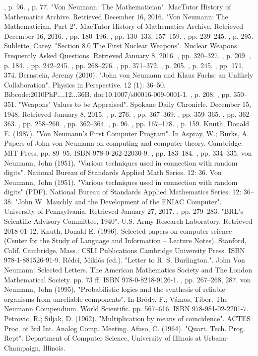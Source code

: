 \begin{enumerate}
, p. 96.
, p. 77.
"Von Neumann: The Mathematician". MacTutor History of Mathematics Archive. Retrieved December 16, 2016.
"Von Neumann: The Mathematician, Part 2". MacTutor History of Mathematics Archive. Retrieved December 16, 2016.
, pp. 180–196.
, pp. 130–133, 157–159.
, pp. 239–245.
, p. 295.
Sublette, Carey. "Section 8.0 The First Nuclear Weapons". Nuclear Weapons Frequently Asked Questions. Retrieved January 8, 2016.
, pp. 320–327.
, p. 209.
, p. 184.
, pp. 242–245.
, pp. 268–276.
, pp. 371–372.
, p. 205.
, p. 245.
, pp. 171, 374.
Bernstein, Jeremy (2010). "John von Neumann and Klaus Fuchs: an Unlikely Collaboration". Physics in Perspective. 12 (1): 36–50. Bibcode:2010PhP....12...36B. doi:10.1007/s00016-009-0001-1.
, p. 208.
, pp. 350–351.
"Weapons' Values to be Appraised". Spokane Daily Chronicle. December 15, 1948. Retrieved January 8, 2015.
, p. 276.
, pp. 367–369.
, pp. 359–365.
, pp. 362–363.
, pp. 258–260.
, pp. 362–364.
, p. 96.
, pp. 167–178.
, p. 159.
Knuth, Donald E. (1987). "Von Neumann's First Computer Program". In Aspray, W.; Burks, A. Papers of John von Neumann on computing and computer theory. Cambridge: MIT Press. pp. 89–95. ISBN 978-0-262-22030-9.
, pp. 183–184.
, pp. 334–335.
von Neumann, John (1951). "Various techniques used in connection with random digits". National Bureau of Standards Applied Math Series. 12: 36.
Von Neumann, John (1951). "Various techniques used in connection with random digits" (PDF). National Bureau of Standards Applied Mathematics Series. 12: 36–38.
"John W. Mauchly and the Development of the ENIAC Computer". University of Pennsylvania. Retrieved January 27, 2017.
, pp. 279–283.
"BRL's Scientific Advisory Committee, 1940". U.S. Army Research Laboratory. Retrieved 2018-01-12.
Knuth, Donald E. (1996). Selected papers on computer science (Center for the Study of Language and Information – Lecture Notes). Stanford, Calif. Cambridge, Mass.: CSLI Publications Cambridge University Press. ISBN 978-1-881526-91-9.
Rédei, Miklós (ed.). "Letter to R. S. Burlington.". John Von Neumann: Selected Letters. The American Mathematics Society and The London Mathematical Society. pp. 73 ff. ISBN 978-0-8218-9126-1.
, pp. 267–268, 287.
von Neumann, John (1995). "Probabilistic logics and the synthesis of reliable organisms from unreliable components". In Bródy, F.; Vámos, Tibor. The Neumann Compendium. World Scientific. pp. 567–616. ISBN 978-981-02-2201-7.
Petrovic, R.; Siljak, D. (1962). "Multiplication by means of coincidence". ACTES Proc. of 3rd Int. Analog Comp. Meeting.
Afuso, C. (1964). "Quart. Tech. Prog. Rept". Department of Computer Science, University of Illinois at Urbana-Champaign, Illinois.

\end{enumerate}
